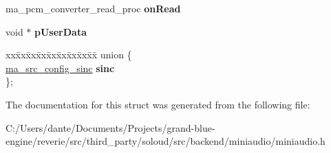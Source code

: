 \begin{DoxyCompactItemize}
ma\+\_\+pcm\+\_\+converter\+\_\+read\+\_\+proc {\bfseries on\+Read}
\item 
\mbox{\label{structma__pcm__converter__config_ae2e5d62b6fe5dc80eed7d1afc4ed8475}} 
void $\ast$ {\bfseries p\+User\+Data}
\item 
\mbox{\label{structma__pcm__converter__config_a7725ad1be92ad517032d5c3364f70c87}} 
\begin{tabbing}
xx\=xx\=xx\=xx\=xx\=xx\=xx\=xx\=xx\=\kill
union \{\\
\>\mbox{\hyperlink{structma__src__config__sinc}{ma\_src\_config\_sinc}} {\bfseries sinc}\\
\}; \\

\end{tabbing}\end{DoxyCompactItemize}


The documentation for this struct was generated from the following file\+:\begin{DoxyCompactItemize}
\item 
C\+:/\+Users/dante/\+Documents/\+Projects/grand-\/blue-\/engine/reverie/src/third\+\_\+party/soloud/src/backend/miniaudio/miniaudio.\+h\end{DoxyCompactItemize}
